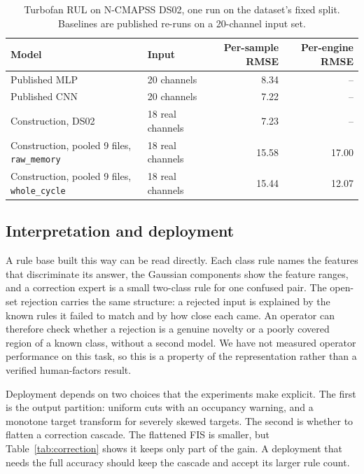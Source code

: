\documentclass[journal]{IEEEtran}
\begin{document}
\begin{table}[t]
\centering
\caption{Turbofan RUL on N-CMAPSS DS02, one run on the dataset's fixed split. Baselines are published re-runs on a 20-channel input set.}
\label{tab:cmapss}
\begin{tabular}{llrr}
\toprule
Model & Input & Per-sample RMSE & Per-engine RMSE \\
\midrule
Published MLP \cite{custode2022evolutionary} & 20 channels & 8.34 & -- \\
Published CNN \cite{custode2022evolutionary} & 20 channels & 7.22 & -- \\
Construction, DS02 & 18 real channels & 7.23 & -- \\
\midrule
Construction, pooled 9 files, \texttt{raw\_memory} & 18 real channels & 15.58 & 17.00 \\
Construction, pooled 9 files, \texttt{whole\_cycle} & 18 real channels & 15.44 & 12.07 \\
\bottomrule
\end{tabular}
\end{table}

\subsection{Interpretation and deployment}
A rule base built this way can be read directly. Each class rule names the features that discriminate its answer, the Gaussian components show the feature ranges, and a correction expert is a small two-class rule for one confused pair. The open-set rejection carries the same structure: a rejected input is explained by the known rules it failed to match and by how close each came. An operator can therefore check whether a rejection is a genuine novelty or a poorly covered region of a known class, without a second model. We have not measured operator performance on this task, so this is a property of the representation rather than a verified human-factors result.

Deployment depends on two choices that the experiments make explicit. The first is the output partition: uniform cuts with an occupancy warning, and a monotone target transform for severely skewed targets. The second is whether to flatten a correction cascade. The flattened FIS is smaller, but Table~\ref{tab:correction} shows it keeps only part of the gain. A deployment that needs the full accuracy should keep the cascade and accept its larger rule count.
\end{document}
